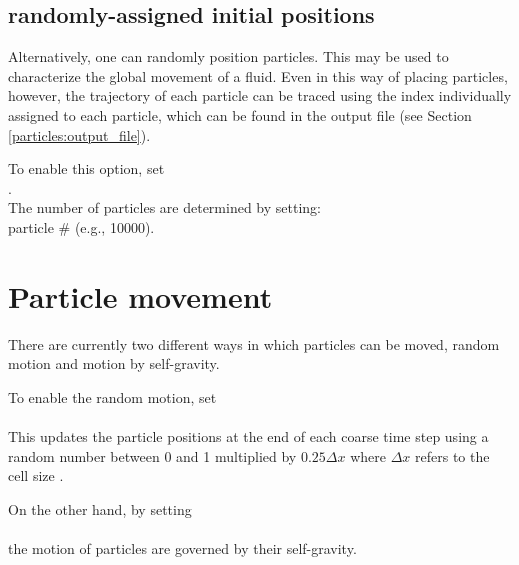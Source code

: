 \subsection{randomly-assigned initial positions}
\label{particle:randomplacement}
Alternatively, one can randomly position particles. This may be used to characterize the global movement of a fluid. Even in this way of placing particles, however, the trajectory of each particle can be traced using the index individually assigned to each particle, which can be found in the output file (see Section \ref{particles:output_file}).

To enable this option, set \\

. \\

\noindent The number of particles are determined by setting: \\

 particle \# (e.g., 10000).


\section{Particle movement}
\noindent There are currently two different ways in which particles can be moved, random motion and motion by self-gravity.

\noindent To enable the random motion, set \\

 \\

\noindent This updates the particle positions at the end of each coarse time step using a 
random number between 0 and 1 multiplied by $0.25 \Delta x$ where $\Delta x$ refers to the cell size .

\vspace{0.1in}
\noindent On the other hand, by setting \\

 \\

the motion of particles are governed by their self-gravity.




